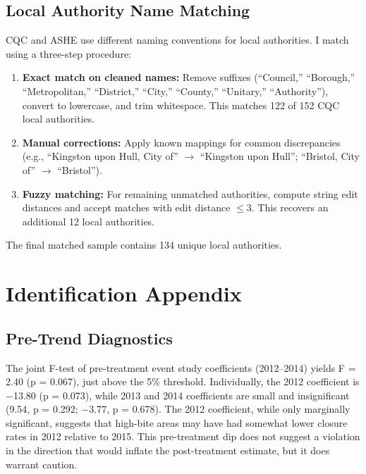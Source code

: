 \documentclass[12pt]{article}
\begin{document}
\subsection{Local Authority Name Matching}

CQC and ASHE use different naming conventions for local authorities. I match using a three-step procedure:

\begin{enumerate}
    \item \textbf{Exact match on cleaned names:} Remove suffixes (``Council,'' ``Borough,'' ``Metropolitan,'' ``District,'' ``City,'' ``County,'' ``Unitary,'' ``Authority''), convert to lowercase, and trim whitespace. This matches 122 of 152 CQC local authorities.

    \item \textbf{Manual corrections:} Apply known mappings for common discrepancies (e.g., ``Kingston upon Hull, City of'' $\to$ ``Kingston upon Hull''; ``Bristol, City of'' $\to$ ``Bristol'').

    \item \textbf{Fuzzy matching:} For remaining unmatched authorities, compute string edit distances and accept matches with edit distance $\leq 3$. This recovers an additional 12 local authorities.
\end{enumerate}

The final matched sample contains 134 unique local authorities.


\section{Identification Appendix}
\label{app:identification}

\subsection{Pre-Trend Diagnostics}

The joint F-test of pre-treatment event study coefficients (2012--2014) yields F = 2.40 (p = 0.067), just above the 5\% threshold. Individually, the 2012 coefficient is $-$13.80 (p = 0.073), while 2013 and 2014 coefficients are small and insignificant (9.54, p = 0.292; $-$3.77, p = 0.678). The 2012 coefficient, while only marginally significant, suggests that high-bite areas may have had somewhat lower closure rates in 2012 relative to 2015. This pre-treatment dip does not suggest a violation in the direction that would inflate the post-treatment estimate, but it does warrant caution.
\end{document}
